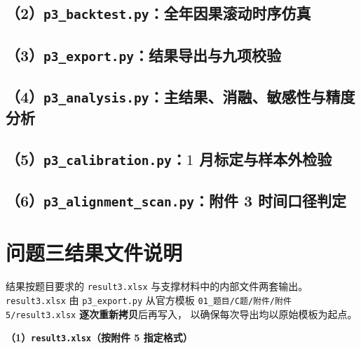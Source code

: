 \documentclass[withoutpreface,bwprint]{cumcmthesis}
\begin{document}
\begin{appendices}
\subsection*{（2）\texttt{p3\_backtest.py}：全年因果滚动时序仿真}


\subsection*{（3）\texttt{p3\_export.py}：结果导出与九项校验}


\subsection*{（4）\texttt{p3\_analysis.py}：主结果、消融、敏感性与精度分析}


\subsection*{（5）\texttt{p3\_calibration.py}：$1$ 月标定与样本外检验}


\subsection*{（6）\texttt{p3\_alignment\_scan.py}：附件 3 时间口径判定}


\section{问题三结果文件说明}

结果按题目要求的 \texttt{result3.xlsx} 与支撑材料中的内部文件两套输出。
\texttt{result3.xlsx} 由 \texttt{p3\_export.py} 从官方模板
\texttt{01\_题目/C题/附件/附件5/result3.xlsx} \textbf{逐次重新拷贝}后再写入，
以确保每次导出均以原始模板为起点。

\textbf{（1）\texttt{result3.xlsx}（按附件 5 指定格式）}


\end{appendices}
\end{document}
